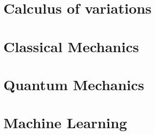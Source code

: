 \documentclass{book}
\begin{document}
\chapter{Calculus of variations}


\chapter{Classical Mechanics}






\chapter{Quantum Mechanics}


\chapter{Machine Learning}


\end{document}

